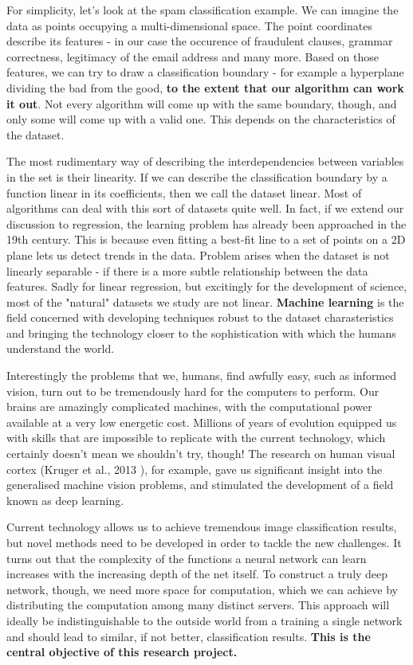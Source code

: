 \documentclass[a4paper, 12pt]{article}
\numberwithin{equation}{section}
\begin{document}
	For simplicity, let's look at the spam classification example. We can imagine the data as points occupying a multi-dimensional space. The point coordinates describe its features - in our case the occurence of fraudulent clauses, grammar correctness, legitimacy of the email address and many more. Based on those features, we can try to draw a classification boundary - for example a hyperplane dividing the bad from the good, \textbf{to the extent that our algorithm can work it out}. Not every algorithm will come up with the same boundary, though, and only some will come up with a valid one. This depends on the characteristics of the dataset.
	
	The most rudimentary way of describing the interdependencies between variables in the set is their linearity. If we can describe the classification boundary by a function linear in its coefficients, then we call the dataset linear. Most of algorithms can deal with this sort of datasets quite well. In fact, if we extend our discussion to regression, the learning problem has already been approached in the 19th century. This is because even fitting a best-fit line to a set of points on a 2D plane lets us detect trends in the data. Problem arises when the dataset is not linearly separable - if there is a more subtle relationship between the data features. Sadly for linear regression, but excitingly for the development of science, most of the "natural" datasets we study are not linear. \textbf{Machine learning} is the field concerned with developing techniques robust to the dataset charasteristics and bringing the technology closer to the sophistication with which the humans understand the world.
	
	Interestingly the problems that we, humans, find awfully easy, such as informed vision, turn out to be tremendously hard for the computers to perform. Our brains are amazingly complicated machines, with the computational power available at a very low energetic cost. Millions of years of evolution equipped us with skills that are impossible to replicate with the current technology, which certainly doesn't mean we shouldn't try, though! The research on human visual cortex (Kruger et al., 2013 \cite{kruger2013deep}), for example, gave us significant insight into the generalised machine vision problems, and stimulated the development of a field known as deep learning.
	
	Current technology allows us to achieve tremendous image classification results, but novel methods need to be developed in order to tackle the new challenges. It turns out that the complexity of the functions a neural network can learn increases with the increasing depth of the net itself. To construct a truly deep network, though, we need more space for computation, which we can achieve by distributing the computation among many distinct servers. This approach will ideally be indistinguishable to the outside world from a training a single network and should lead to similar, if not better, classification results. \textbf{This is the central objective of this research project.}
	
\end{document}
